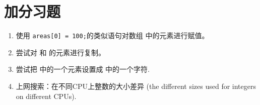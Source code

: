 \section{加分习题}

\begin{enumerate}
\item 使用 \verb|areas[0] = 100;|的类似语句对数组  中的元素进行赋值。
\item 尝试对  和  的元素进行复制。
\item 尝试把  中的一个元素设置成  中的一个字符.
\item 上网搜索：在不同CPU上整数的大小差异 (the different sizes used for integers on different CPUs).
\end{enumerate}

